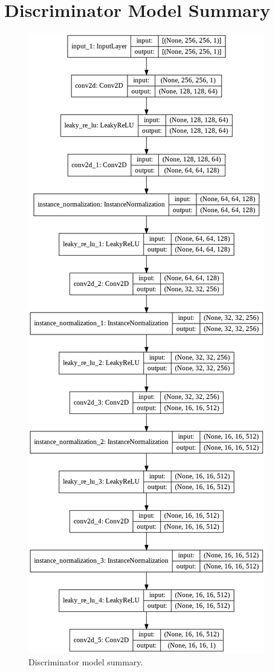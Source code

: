 \section{Discriminator Model Summary}
\begin{figure}[H]
	    \begin{center} \includegraphics[scale=0.35]{images/Appendix/DiscriminatorModelSummary.png}
	    \caption{Discriminator model summary.}
	    \label{fig:DiscriminatorModelSummary}
	    \end{center}
\end{figure}




